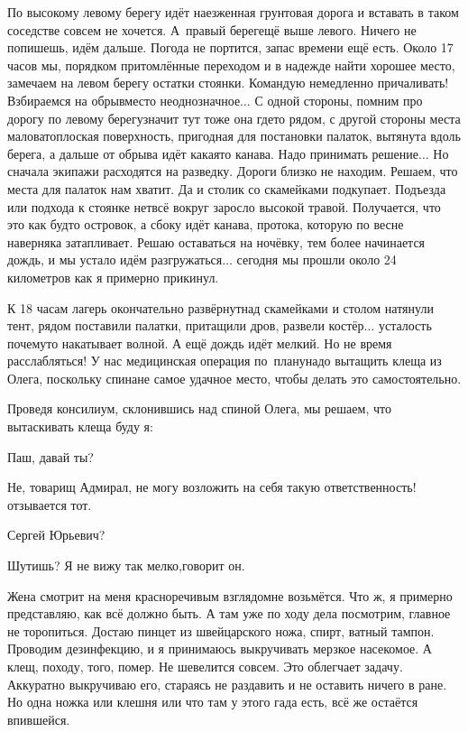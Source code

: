 По высокому левому берегу идёт наезженная грунтовая дорога и вставать в таком соседстве совсем не хочется. А~правый берег\mdash ещё выше левого. Ничего не попишешь, идём дальше. Погода не портится, запас времени ещё есть. Около 17 часов мы, порядком притомлённые переходом и в надежде найти хорошее место, замечаем на левом берегу остатки стоянки. Командую немедленно причаливать! Взбираемся на обрыв\mdash место неоднозначное$\ldots$ С одной стороны, помним про дорогу по левому берегу\mdash значит тут тоже она где\sdash то рядом, с другой стороны места маловато\mdash плоская поверхность, пригодная для постановки палаток, вытянута вдоль берега, а дальше от обрыва идёт какая\sdash то канава. Надо принимать решение$\ldots$ Но сначала экипажи расходятся на разведку. Дороги близко не находим. Решаем, что места для палаток нам хватит. Да и столик со скамейками подкупает. Подъезда или подхода к стоянке нет\mdash всё вокруг заросло высокой травой. Получается, что это как будто островок, а сбоку идёт канава, протока, которую по весне наверняка затапливает. Решаю оставаться на ночёвку, тем более начинается дождь, и мы устало идём разгружаться$\ldots$ сегодня мы прошли около 24 километров как я примерно прикинул.

К 18 часам лагерь окончательно развёрнут\mdash над скамейками и столом натянули тент, рядом поставили палатки, притащили дров, развели костёр$\ldots$ усталость почему\sdash то накатывает волной. А ещё дождь идёт мелкий. Но не время расслабляться! У нас медицинская операция по~плану\mdash надо вытащить клеща из Олега, поскольку спина\mdash не самое удачное место, чтобы делать это самостоятельно. 

Проведя консилиум, склонившись над спиной Олега, мы решаем, что вытаскивать клеща буду я:

\diagdash Паш, давай ты?

\diagdash Не, товарищ Адмирал, не могу возложить на себя такую ответственность!\mdash отзывается тот.

\diagdash Сергей Юрьевич?

\diagdash Шутишь? Я не вижу так мелко,\mdash говорит он.

Жена смотрит на меня красноречивым взглядом\mdash не возьмётся. Что ж, я примерно представляю, как всё должно быть. А там уже по ходу дела посмотрим, главное не торопиться. Достаю пинцет из швейцарского ножа, спирт, ватный тампон. Проводим дезинфекцию, и я принимаюсь выкручивать мерзкое насекомое. А клещ, походу, того, помер. Не шевелится совсем. Это облегчает задачу. Аккуратно выкручиваю его, стараясь не раздавить и не оставить ничего в ране. Но одна ножка или клешня или что там у этого гада есть, всё же остаётся впившейся. 

